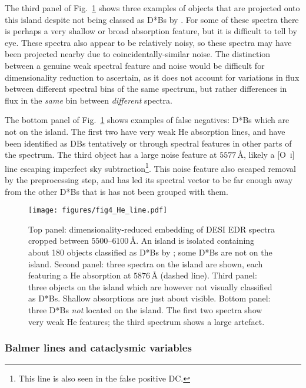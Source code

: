 \documentclass[fleqn,usenatbib]{mnras}
\begin{document}
The third panel of Fig.~\ref{fig:He_lines} shows three examples of objects that are projected onto this island despite not being classed as D*Bs by \citet{manser24}.
For some of these spectra there is perhaps a very shallow or broad absorption feature, but it is difficult to tell by eye.
These spectra also appear to be relatively noisy, so these spectra may have been projected nearby due to coincidentally-similar noise.
The distinction between a genuine weak spectral feature and noise would be difficult for dimensionality reduction to ascertain, as it does not account for variations in flux between different spectral bins of the same spectrum, but rather differences in flux in the \textit{same} bin between \textit{different} spectra.

The bottom panel of Fig.~\ref{fig:He_lines} shows examples of false negatives: D*Bs which are not on the island.
The first two have very weak He absorption lines, and have been identified as DBs tentatively or through spectral features in other parts of the spectrum.
The third object has a large noise feature at $5577\,\text{\AA}$, likely a [O~\textsc{i}] line escaping imperfect sky subtraction\footnote{
    This line is also seen in the false positive DC.
}.
This noise feature also escaped removal by the preprocessing step, and has led its spectral vector to be far enough away from the other D*Bs that is has not been grouped with them.

\begin{figure}
\centering
\texttt{[image: figures/fig4\_He\_line.pdf]}
\caption{
    Top panel: dimensionality-reduced embedding of DESI EDR spectra cropped between $5500$--$6100\,\text{\AA}$.
    An island is isolated containing about 180 objects classified as D*Bs by \citet{manser24}; some D*Bs are not on the island.
    Second panel: three spectra on the island are shown, each featuring a He absorption at $5876\,\text{\AA}$ (dashed line).
    Third panel: three objects on the island which are however not visually  classified as D*Bs.
    Shallow absorptions are just about visible.
    Bottom panel: three D*Bs \textit{not} located on the island.
    The first two spectra show very weak He features; the third spectrum shows a large artefact.
}
\label{fig:He_lines}
\end{figure}

\subsubsection{Balmer lines and cataclysmic variables}
\label{sec:CVs}
\end{document}

